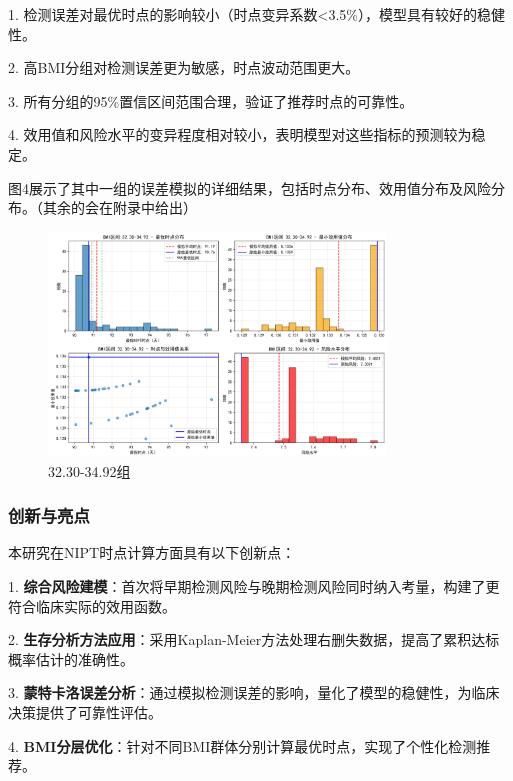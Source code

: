 \documentclass{article}
\begin{document}
1. 检测误差对最优时点的影响较小（时点变异系数<3.5\%），模型具有较好的稳健性。

2. 高BMI分组对检测误差更为敏感，时点波动范围更大。

3. 所有分组的95\%置信区间范围合理，验证了推荐时点的可靠性。

4. 效用值和风险水平的变异程度相对较小，表明模型对这些指标的预测较为稳定。

图4展示了其中一组的误差模拟的详细结果，包括时点分布、效用值分布及风险分布。（其余的会在附录中给出）

\begin{figure}[H]  %
    \centering  %
    \includegraphics[width=0.8\textwidth]{graph/error_analysis_BMI_32.30-34.92.png}  %
    \caption{32.30-34.92组}  %
    \label{fig:single}  %
\end{figure}

\subsubsection{\textbf{创新与亮点}}
本研究在NIPT时点计算方面具有以下创新点：

1. \textbf{综合风险建模}：首次将早期检测风险与晚期检测风险同时纳入考量，构建了更符合临床实际的效用函数。

2. \textbf{生存分析方法应用}：采用Kaplan-Meier方法处理右删失数据，提高了累积达标概率估计的准确性。

3. \textbf{蒙特卡洛误差分析}：通过模拟检测误差的影响，量化了模型的稳健性，为临床决策提供了可靠性评估。

4. \textbf{BMI分层优化}：针对不同BMI群体分别计算最优时点，实现了个性化检测推荐。
\end{document}
